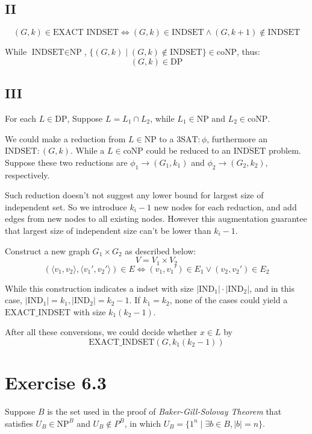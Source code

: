 \documentclass[paper=a4, fontsize=11pt]{scrartcl} %
\numberwithin{equation}{section} %
\numberwithin{figure}{section} %
\numberwithin{table}{section} %
\begin{document}
\subsection*{II}
$$(G, k) \in \textrm{EXACT INDSET} \iff (G, k) \in \textrm{INDSET} \wedge (G, k + 1) \not\in \textrm{INDSET} $$

While $\textrm{INDSET} \in \textrm{NP}$, $\{(G, k)\mid (G, k) \not \in \textrm{INDSET}\} \in \textrm{coNP}$, thus:
$$(G, k) \in \textrm{DP} $$ 
\subsection*{III}

For each $L \in \textrm{DP}$, Suppose $L = L_1 \cap L_2$, while $L_1\in\textrm{NP}$ and $L_2\in\textrm{coNP}$.

We could make a reduction from $L\in \textrm{NP}$ to a $3\textrm{SAT}:\phi$, furthermore an $\textrm{INDSET}:(G,k)$. While a $L \in \textrm{coNP}$ could be reduced to an $\overline{\textrm{INDSET}}$ problem. Suppose these two reductions are $\phi_1 \rightarrow (G_1, k_1)$ and $\phi_2 \rightarrow (G_2, k_2)$, respectively.

Such reduction doesn't not suggest any lower bound for largest size of independent set. So we introduce $k_i-1$ new nodes for each reduction, and add edges from new nodes to all existing nodes. However this augmentation guarantee that largest size of independent size can't be lower than $k_i - 1$.

Construct a new graph $G_1\times G_2$ as described below:
$$V = V_1 \times V_2$$
$$(\langle v_1, v_2 \rangle, \langle v_1', v_2' \rangle) \in E \iff (v_1, v_1') \in E_1 \vee (v_2, v_2') \in E_2 $$ 

While this construction indicates a indset with size $|\textrm{IND}_1|\cdot |\textrm{IND}_2|$, and in this case, $|\textrm{IND}_1| = k_1, |\textrm{IND}_2| = k_2 - 1$. If $k_1 = k_2$, none of the cases could yield a $\textrm{EXACT\_INDSET}$ with size $k_1(k_2-1)$.

After all these conversions, we could decide whether $x\in L$ by $$\textrm{EXACT\_INDSET}(G, k_1(k_2-1))$$

\section*{Exercise 6.3}

Suppose $B$ is the set used in the proof of {\it Baker-Gill-Solovay Theorem} that satisfies $U_B\in \textrm{NP}^B$ and $U_B\not\in P^B$, in which $U_B = \{1^n \mid \exists b\in B, |b| = n\}$.
\end{document}

